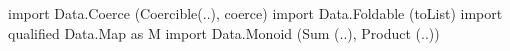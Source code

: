 \begin{code}
import Data.Coerce (Coercible(..), coerce)
import Data.Foldable (toList)
import qualified Data.Map as M
import Data.Monoid (Sum (..), Product (..))
\end{code}
